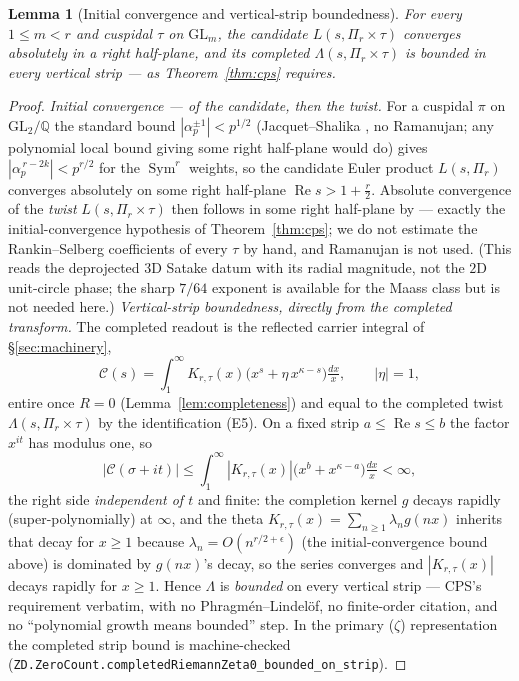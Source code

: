 \documentclass[11pt]{article}
\newtheorem{lemma}[theorem]{Lemma}
\theoremstyle{definition}
\renewcommand{\Re}{\operatorname{Re}}
\newcommand{\Sym}{\operatorname{Sym}}
\begin{document}
\begin{lemma}[Initial convergence and vertical-strip boundedness]\label{lem:bounded}
For every $1\le m<r$ and cuspidal $\tau$ on $\mathrm{GL}_m$, the candidate $L(s,\Pi_r\times\tau)$ converges
absolutely in a right half-plane, and its completed $\Lambda(s,\Pi_r\times\tau)$ is bounded in every vertical
strip --- as Theorem~\ref{thm:cps} requires.
\end{lemma}

\begin{proof}
\emph{Initial convergence --- of the candidate, then the twist.} For a cuspidal $\pi$ on
$\mathrm{GL}_2/\mathbb Q$ the standard bound $|\alpha_p^{\pm1}|<p^{1/2}$ (Jacquet--Shalika \cite{JS}, no
Ramanujan; any polynomial local bound giving some right half-plane would do) gives $|\alpha_p^{\,r-2k}|<p^{r/2}$
for the $\Sym^r$ weights, so the candidate Euler product
$L(s,\Pi_r)$ converges absolutely on some right half-plane $\Re s>1+\tfrac r2$. Absolute convergence of the
\emph{twist} $L(s,\Pi_r\times\tau)$ then follows in some right half-plane by \cite[Lemma~2.2]{CPS} --- exactly
the initial-convergence hypothesis of Theorem~\ref{thm:cps}; we do not estimate the Rankin--Selberg
coefficients of every $\tau$ by hand, and Ramanujan is not used. (This reads the deprojected $3$D Satake datum
with its radial magnitude, not the $2$D unit-circle phase; the sharp $7/64$ exponent \cite{KimSarnak} is
available for the Maass class but is not needed here.)
\emph{Vertical-strip boundedness, directly from the completed transform.} The completed readout is the
reflected carrier integral of \S\ref{sec:machinery},
\[
  \mathcal C(s)=\int_1^\infty K_{r,\tau}(x)\bigl(x^{s}+\eta\,x^{\kappa-s}\bigr)\tfrac{dx}{x},\qquad|\eta|=1,
\]
entire once $R=0$ (Lemma~\ref{lem:completeness}) and equal to the completed twist $\Lambda(s,\Pi_r\times\tau)$ by
the identification \textup{(E5)}. On a fixed strip $a\le\Re s\le b$ the factor $x^{it}$ has modulus one, so
\[
  |\mathcal C(\sigma+it)|\le\int_1^\infty|K_{r,\tau}(x)|\bigl(x^{b}+x^{\kappa-a}\bigr)\tfrac{dx}{x}<\infty,
\]
the right side \emph{independent of $t$} and finite: the completion kernel $g$ decays rapidly (super-polynomially)
at $\infty$, and the theta $K_{r,\tau}(x)=\sum_{n\ge1}\lambda_n g(nx)$ inherits that decay for $x\ge1$ because
$\lambda_n=O(n^{r/2+\epsilon})$ (the initial-convergence bound above) is dominated by $g(nx)$'s decay, so the
series converges and $|K_{r,\tau}(x)|$ decays rapidly for $x\ge1$. Hence $\Lambda$ is \emph{bounded} on every
vertical strip --- CPS's requirement verbatim,
with no Phragm\'en--Lindel\"of, no finite-order citation, and no ``polynomial growth means bounded'' step. In
the primary ($\zeta$) representation the completed strip bound is machine-checked
(\texttt{ZD.ZeroCount.completedRiemannZeta0\_bounded\_on\_strip}).
\end{proof}
\end{document}
